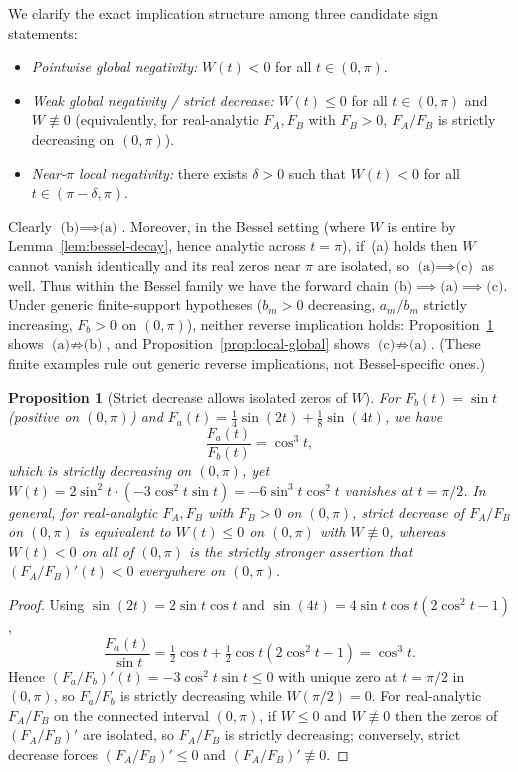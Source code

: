 \documentclass[11pt]{article}
\newtheorem{proposition}[theorem]{Proposition}
\theoremstyle{remark}
\begin{document}
We clarify the exact implication structure among three candidate sign statements:
\begin{itemize}
  \item[(b)] \emph{Pointwise global negativity:} $W(t) < 0$ for all $t \in (0,\pi)$.
  \item[(a)] \emph{Weak global negativity / strict decrease:} $W(t) \le 0$ for all
  $t \in (0,\pi)$ and $W \not\equiv 0$ (equivalently, for real-analytic $F_A, F_B$ with
  $F_B > 0$, $F_A/F_B$ is strictly decreasing on $(0,\pi)$).
  \item[(c)] \emph{Near-$\pi$ local negativity:} there exists $\delta > 0$ such that
  $W(t) < 0$ for all $t \in (\pi - \delta, \pi)$.
\end{itemize}
Clearly $\text{(b)} \implies \text{(a)}$. Moreover, in the Bessel setting (where $W$ is
entire by Lemma~\ref{lem:bessel-decay}, hence analytic across $t = \pi$), if~(a) holds
then $W$ cannot vanish identically and its real zeros near $\pi$ are isolated, so
$\text{(a)} \implies \text{(c)}$ as well. Thus within the Bessel family we have the forward
chain $\text{(b)} \implies \text{(a)} \implies \text{(c)}$. Under generic finite-support
hypotheses ($b_m > 0$ decreasing, $a_m/b_m$ strictly increasing, $F_b > 0$ on $(0,\pi)$),
neither reverse implication holds: Proposition~\ref{prop:strict-vs-neg} shows
$\text{(a)} \not\Rightarrow \text{(b)}$, and Proposition~\ref{prop:local-global} shows
$\text{(c)} \not\Rightarrow \text{(a)}$. (These finite examples rule out generic reverse
implications, not Bessel-specific ones.)

\begin{proposition}[Strict decrease allows isolated zeros of $W$]
\label{prop:strict-vs-neg}
For $F_b(t) = \sin t$ (positive on $(0,\pi)$) and
$F_a(t) = \tfrac{1}{4}\sin(2t) + \tfrac{1}{8}\sin(4t)$, we have
\[
\frac{F_a(t)}{F_b(t)} = \cos^3 t,
\]
which is strictly decreasing on $(0,\pi)$, yet
$W(t) = 2\sin^2 t \cdot (-3\cos^2 t \sin t) = -6\sin^3 t\cos^2 t$ vanishes at $t = \pi/2$.
In general, for real-analytic $F_A, F_B$ with $F_B > 0$ on $(0,\pi)$, strict decrease of
$F_A/F_B$ on $(0,\pi)$ is equivalent to $W(t) \le 0$ on $(0,\pi)$ with $W \not\equiv 0$,
whereas $W(t) < 0$ on all of $(0,\pi)$ is the strictly stronger assertion that
$(F_A/F_B)'(t) < 0$ everywhere on $(0,\pi)$.
\end{proposition}

\begin{proof}
Using $\sin(2t) = 2\sin t\cos t$ and $\sin(4t) = 4\sin t\cos t(2\cos^2 t - 1)$,
\[
\frac{F_a(t)}{\sin t}
= \tfrac{1}{2}\cos t + \tfrac{1}{2}\cos t(2\cos^2 t - 1) = \cos^3 t.
\]
Hence $(F_a/F_b)'(t) = -3\cos^2 t\sin t \le 0$ with unique zero at $t = \pi/2$ in $(0,\pi)$,
so $F_a/F_b$ is strictly decreasing while $W(\pi/2)=0$. For real-analytic $F_A/F_B$ on the
connected interval $(0,\pi)$, if $W \le 0$ and $W \not\equiv 0$ then the zeros of
$(F_A/F_B)'$ are isolated, so $F_A/F_B$ is strictly decreasing; conversely, strict decrease
forces $(F_A/F_B)' \le 0$ and $(F_A/F_B)' \not\equiv 0$.
\end{proof}
\end{document}
